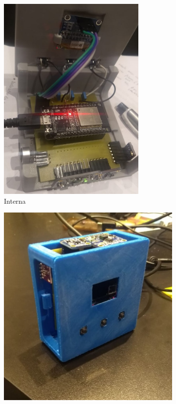 \documentclass[../monografia.tex]{subfiles}
\begin{document}
\begin{figure}[h]
	\centering
	\begin{subfigure}{0.5\textwidth}
		\centering
		\includegraphics[width=0.8\textwidth]{placa-final}
		\caption{Interna}
		\label{fig:interna}
	\end{subfigure}%
	\begin{subfigure}{0.5\textwidth}
		\centering
		\includegraphics[width=\textwidth]{montagem-final.jpg}

\end{subfigure}
\end{figure}
\end{document}
